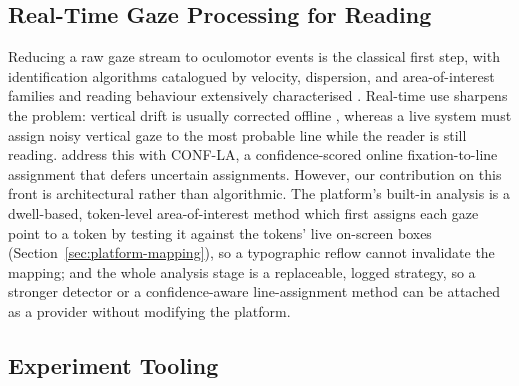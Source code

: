\subsection{Real-Time Gaze Processing for Reading}

Reducing a raw gaze stream to oculomotor events is the classical first step, with identification algorithms catalogued by velocity, dispersion, and area-of-interest families \cite{salvucci2000identifying,andersson2017one} and reading behaviour extensively characterised \cite{rayner1998eyemovements}.
Real-time use sharpens the problem: vertical drift is usually corrected offline \cite{carr2022drift}, whereas a live system must assign noisy vertical gaze to the most probable line while the reader is still reading.
\citet{kaltenberger2026line} address this with CONF-LA, a confidence-scored online fixation-to-line assignment that defers uncertain assignments.
However, our contribution on this front is architectural rather than algorithmic.
The platform's built-in analysis is a dwell-based, token-level area-of-interest method which first assigns each gaze point to a token by testing it against the tokens' live on-screen boxes (Section~\ref{sec:platform-mapping}), so a typographic reflow cannot invalidate the mapping; and the whole analysis stage is a replaceable, logged strategy, so a stronger detector or a confidence-aware line-assignment method can be attached as a provider without modifying the platform.

\subsection{Experiment Tooling}

